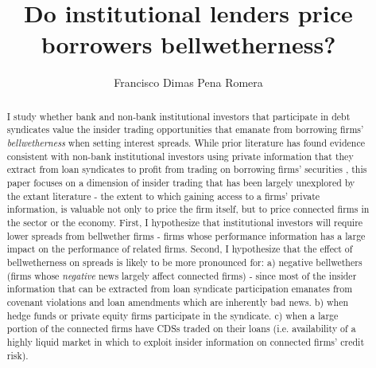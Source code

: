 \documentclass[english, 1p]{elsarticle}
\begin{document}
\title{Do institutional lenders price borrowers bellwetherness?}



\author{Francisco Dimas Pena Romera}

\address{Accounting PhD Student}
\address{Kenan-Flagler Business School, University of North Carolina, Chapel Hill, NC 27599-3490, USA}
\address{Summer paper}



\pagebreak


\begin{abstract}
	
	
	
	I study whether bank and non-bank institutional investors that participate in debt syndicates value the insider trading opportunities that emanate from borrowing firms' \textit{bellwetherness} when setting interest spreads. While prior literature has found evidence consistent with non-bank institutional investors using private information that they extract from loan syndicates to profit from trading on borrowing firms' securities \cite{Ivashina2011, Massoud2011, Bushman2010, Bushman2014}, this paper focuses on a dimension of insider trading that has been largely unexplored by the extant literature - the extent to which gaining access to a firms' private information, is valuable not only to price the firm itself, but to price connected firms in the sector or the economy. 
	First, I hypothesize that institutional investors will require lower spreads from bellwether firms - firms whose performance information has a large impact on the performance of related firms. Second, I hypothesize that the effect of bellwetherness on spreads is likely to be more pronounced for: a) negative bellwethers (firms whose \textit{negative} news largely affect connected firms) - since most of the insider information that can be extracted from loan syndicate participation emanates from covenant violations and loan amendments which are inherently bad news. b) when hedge funds or private equity firms participate in the syndicate. c) when a large portion of the connected firms have CDSs traded on their loans (i.e. availability of a highly liquid market in which to exploit insider information on connected firms' credit risk). 
	
\end{abstract}



\maketitle
\end{document}
